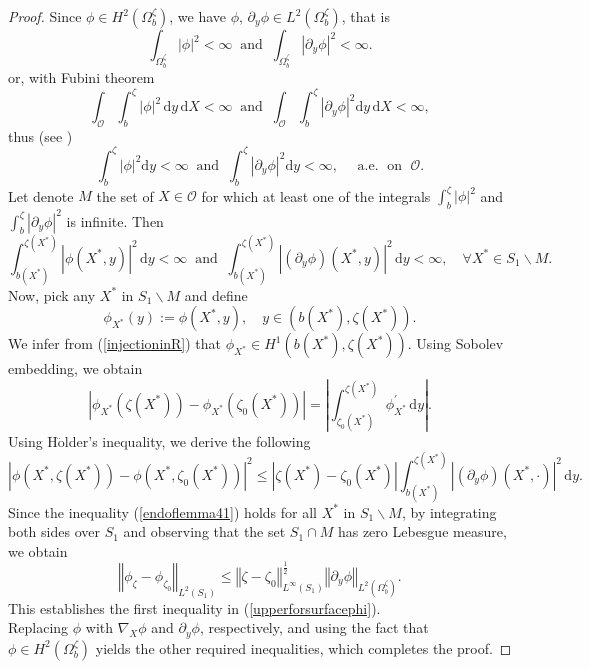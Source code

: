 \documentclass[11pt]{article}
\newcommand{\dd}{\mathrm{d}}
\begin{document}
\begin{proof}
	Since $\phi \in H ^2(\Omega_b^{\zeta})$, we have $\phi,\,  \partial _y \phi \in L^2(\Omega_b^{\zeta})$, that is %
	$$\displaystyle\int_{\Omega_b^{\zeta}}|\phi|^2<\infty\;\;\text{and}\;\;\displaystyle\int_{\Omega_b^{\zeta}}|\partial_y\phi|^2<\infty.$$
	or, with Fubini theorem
	$$\displaystyle\int_{\mathcal O} \displaystyle\int_{b}^{\zeta} |\phi|^2\, \dd y\,\dd X<\infty\;\;\text{and}\;\;\displaystyle\int_{\mathcal O} \displaystyle\int_{b}^{\zeta}|\partial_y\phi|^2 \dd y\,\dd X <\infty,$$
	thus (see \cite{bogachev2007measure})
	$$ \displaystyle\int_{b}^{\zeta} |\phi|^2 \dd y<\infty\;\;\text{and}\;\; \displaystyle\int_{b}^{\zeta}|\partial_y\phi|^2 \dd y<\infty,\quad \text{ a.e.}\; \text{ on }\; \mathcal O. $$
	Let denote $M$ the set of  $X\in \mathcal O  $ for which at least one of the integrals $\displaystyle\int_{b}^{\zeta} |\phi|^2$ and $\displaystyle\int_{b}^{\zeta}|\partial_y\phi|^2$ is infinite. Then 
	\begin{equation}\label{injectioninR}
		\displaystyle\int_{b(X^{\ast})}^{\zeta(X^{\ast})} |\phi(X^{\ast},y)|^2 \,\dd y<\infty \;\;\text{and}\;\; \displaystyle\int_{b(X^{\ast})}^{\zeta(X^{\ast})}|(\partial_y\phi)(X^{\ast},y)|^2 \,\dd y<\infty,\quad \forall X^{\ast}\in S_1\backslash  M.  
	\end{equation}
	Now, pick any $X^{\ast}$ in $S_1\backslash  M$ and define  $$\phi_{X^{\ast}}(y) :=\phi(X^{\ast},y),\quad y\in ( b(X^{\ast}),\zeta(X^{\ast} ) ) .$$ We infer from (\ref{injectioninR}) that $\phi_{X^{\ast}}\in H^1(b(X^{\ast}),\zeta(X^{\ast}))$. Using Sobolev embedding, we obtain 
	$$\left| \phi_{X^{\ast}}(\zeta(X^{\ast}))-\phi_{X^{\ast}}(\zeta_0(X^{\ast})) \right|=\left|  \displaystyle\int_{\zeta_0(X^{\ast})}^{\zeta(X^{\ast})}\phi_{X^{\ast}}^{'} \,\dd y   \right|.$$
	Using H$\ddot{\text{o}}$lder’s inequality, we derive the following 
	\begin{equation}\label{endoflemma41}
		\left| \phi(X^{\ast},\zeta(X^{\ast}))-\phi(X^{\ast},\zeta_0(X^{\ast})) \right|^2\leq \left| \zeta(X^{\ast}) -\zeta_0(X^{\ast})\right|  \displaystyle\int_{b(X^{\ast})}^{\zeta(X^{\ast})}|(\partial_y\phi)(X^{\ast},\cdot)|^2\, \dd y.
	\end{equation}
	Since the inequality (\ref{endoflemma41}) holds for all $X^{\ast}$ in $S_1\backslash M$, by integrating both sides over $S_1$ and observing that the set $S_1\cap M$ 
	has zero Lebesgue measure, we obtain
	$$\left\Vert  \phi_{\zeta}-\phi_{\zeta_0}   \right\Vert_{L^2(S_1)}\leq\left\Vert \zeta-\zeta_0  \right\Vert^{\frac{1}{2}}_{L^{\infty}(S_1)}\left\Vert  \partial_y\phi  \right\Vert_{L^2(\Omega_b^{\zeta})} .$$
	This establishes the first inequality in (\ref{upperforsurfacephi}).\\
	Replacing $\phi$ with $\nabla_X \phi$ and $\partial_y\phi$, respectively,  and using the fact that $\phi\in H^{2}(\Omega_{b}^{\zeta})$ yields the other required inequalities, which completes the proof.
\end{proof}
\end{document}
